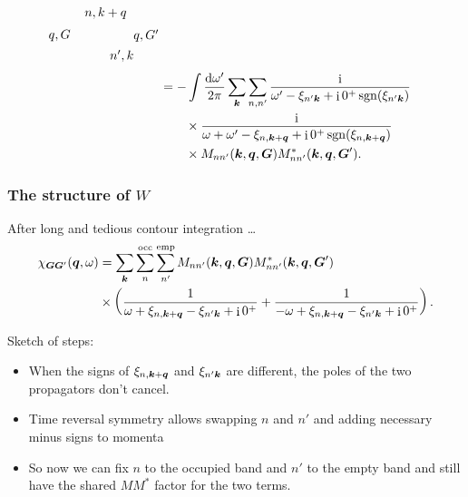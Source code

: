 \documentclass[t]{beamer}
\DeclareMathOperator{\ii}{i}
\DeclareMathOperator{\sgn}{sgn}
\begin{document}
\begin{frame}
\begin{equation}
\begin{aligned}
\begin{gathered}
\begin{tikzpicture}[x=0.75pt,y=0.75pt,yscale=-0.6,xscale=0.6]
                \draw (35.5,59) node [anchor=east] [inner sep=0.75pt]    {$q,G$};
                \draw (141.52,59) node [anchor=west] [inner sep=0.75pt]    {$q,G'$};
                \draw (100,82) node [anchor=north west][inner sep=0.75pt]    {$n',k$};
                \draw (56,8) node [anchor=north west][inner sep=0.75pt]    {$n,k+q$};
                
                
                \end{tikzpicture}            
        \end{gathered} \\
        &= - \int \frac{\dd{\omega'}}{2\pi} \sum_{\vb*{k}} \sum_{n, n'}
        \frac{\ii}{\omega' - \xi_{n' \vb*{k}} + \ii 0^+ \sgn(\xi_{n' \vb*{k}})} \\
        &\quad \quad \times \frac{\ii}{\omega + \omega' - \xi_{n, \vb*{k} + \vb*{q}} + \ii 0^+ \sgn(\xi_{n, \vb*{k} + \vb*{q}})} \\
        &\quad \quad \times M_{n n' } (\vb*{k}, \vb*{q}, \vb*{G}) M_{nn'}^* (\vb*{k}, \vb*{q}, \vb*{G}') .
    \end{aligned}
\end{equation}

\end{frame}

\begin{frame}
\frametitle{The structure of $W$}

After long and tedious contour integration \dots
\begin{equation}
    \begin{aligned}
        \chi_{\vb*{G} \vb*{G}'}(\vb*{q}, \omega)
        &= \sum_{\vb*{k}} \sum_{n}^{\text{occ}} \sum_{n'}^{\text{emp}} 
        M_{n n'} (\vb*{k}, \vb*{q}, \vb*{G}) M^*_{nn'} (\vb*{k}, \vb*{q}, \vb*{G}') \\
        &\times \left(
        \frac{
            1
        }{
            \omega + \xi_{n, \vb*{k} + \vb*{q}} - \xi_{n' \vb*{k}} + \ii 0^+
        }
        + \frac{
            1
        }{
            - \omega + \xi_{n, \vb*{k} + \vb*{q}} - \xi_{n' \vb*{k}} + \ii 0^+
        }
        \right).
    \end{aligned}
    \label{eq:chi-full}
\end{equation}

Sketch of steps: 
\begin{itemize}
    \item When the signs of $\xi_{n, \vb*{k} + \vb*{q}}$ and $\xi_{n' \vb*{k}}$
        are different, 
        the poles of the two propagators don't cancel.
    \item Time reversal symmetry allows 
        swapping $n$ and $n'$ and adding necessary minus signs to momenta 
    \item So now we can fix $n$ to the occupied band 
        and $n'$ to the empty band 
        and still have the shared $M M^*$ factor for the two terms. 
\end{itemize}

\end{frame}
\end{document}

